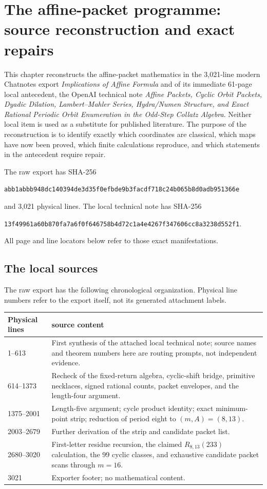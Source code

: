 \section{The affine-packet programme: source reconstruction and exact repairs}
\label{sec:affine-packet-source-audit}

This chapter reconstructs the affine-packet mathematics in the 3,021-line modern
Chatnotes export \emph{Implications of Affine Formula} and of its immediate
61-page local antecedent, the OpenAI technical note \emph{Affine Packets,
Cyclic Orbit Packets, Dyadic Dilation, Lambert--Mahler Series, Hydra/Numen
Structure, and Exact Rational Periodic Orbit Enumeration in the Odd-Step
Collatz Algebra}.  Neither local item is used as a substitute for published
literature.  The purpose of the reconstruction is to identify exactly which
coordinates are classical, which maps have now been proved, which finite
calculations reproduce, and which statements in the antecedent require
repair.

The raw export has SHA-256
\begin{center}
\texttt{abb1abbb948dc140394de3d35f0efbde9b3facdf718c24b065b8d0adb951366e}
\end{center}
and 3,021 physical lines.  The local technical note has SHA-256
\begin{center}
\texttt{13f49961a60b870fa7a6f0f646758b4d72c1a4e4267f347606cc8a3238d552f1}.
\end{center}
All page and line locators below refer to those exact manifestations.

\subsection{The local sources}

The raw export has the following chronological organization.  Physical line
numbers refer to the export itself, not its generated attachment labels.
\begin{center}
\begin{tabular}{p{}p{}}
\toprule
Physical lines & source content\\
\midrule
1--613 & First synthesis of the attached local technical note; source names
and theorem numbers here are routing prompts, not independent evidence.\\
614--1373 & Recheck of the fixed-return algebra, cyclic-shift bridge,
primitive necklaces, signed rational counts, packet envelopes, and the
length-four argument.\\
1375--2001 & Length-five argument; cycle product identity; exact
minimum-point strip; reduction of period eight to $(m,A)=(8,13)$.\\
2003--2679 & Further derivation of the strip and candidate packet list.\\
2680--3020 & First-letter residue recursion, the claimed
$R_{8,13}(233)$ calculation, the 99 cyclic classes, and exhaustive candidate
packet scans through $m=16$.\\
3021 & Exporter footer; no mathematical content.\\
\bottomrule
\end{tabular}
\end{center}

